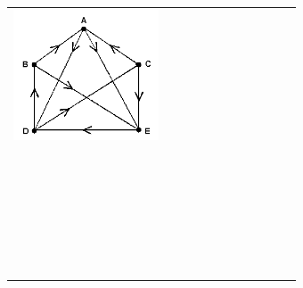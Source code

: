 			\begin{center}
				\tablefirsthead{}
				\tablehead{}
				\tabletail{}
				\tablelasttail{}
				\begin{supertabular}{m{7.0350003cm}m{0.81600004cm}m{0.81600004cm}|m{0.81600004cm}|m{0.81600004cm}|m{0.81600004cm}|m{0.81600004cm}|m{0.81600004cm}|}
				\centering  \includegraphics[width=4.318cm,height=3.859cm]{image/a2012Logique2eme-img049.png}  &
				~
				 &
				 &
				 &
				 &
				 &
				 &
				\\\hhline{~~~-----}
				 &
				~
				 &
				 &
				 &
				 &
				 &
				 &
				\centering{}\\\hhline{~~~-----}
				 &
				~
				 &
				 &
				 &
				 &
				 &
				 &
				\centering{}\\\hhline{~~~-----}
				 &
				~
				 &
				 &
				 &
				 &
				 &
				 &
				\centering{}\\\hhline{~~~-----}
				 &
				~
				 &
				 &
				 &
				 &
				 &
				 &
				\centering{}\\\hhline{~~~-----}
				 &
				~
				 &
				 &
				 &
				 &
				 &
				 &
				\centering{}\\\hhline{~~~-----}
				 &
				~
				 &
				 &
				 &
				 &
				 &
				 &
				\\
				\end{supertabular}
			\end{center}
			
